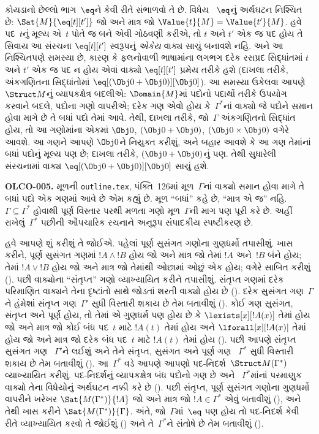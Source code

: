 કોયડાનો છેલ્લો ભાગ~$\eq$ને કેવી રીતે સંભાળવો તે છે. વિધેય
~$\eq$નું અર્થઘટન નિશ્ચિત છે: $\Sat{M}{\eq[t][t']}$ જો અને માત્ર જો
$\Value{t}{M}=\Value{t'}{M}$. હવે પદ~$t$નું મૂલ્ય એ~$t$ પોતે જ બને
એવી ગોઠવણી કરીએ, તો $t$ અને $t'$ એક જ પદ હોય તે સિવાય આ સંરચના
$\eq[t][t']$ સ્વરૂપનું \emph{એકેય} વાક્ય સાચું બનાવશે નહિ. અને આ
નિશ્ચિતપણે સમસ્યા છે, કારણ કે ફલનોવાળી ભાષામાંના લગભગ દરેક
રસપ્રદ સિદ્ધાંતમાં $t$ અને $t'$ એક જ પદ ન હોય એવાં વાક્યો
$\eq[t][t']$ પ્રમેય તરીકે હશે (દાખલા તરીકે, અંકગણિતના સિદ્ધાંતોમાં
$\eq[(\Obj 0+\Obj 0)][\Obj 0]$). આ સમસ્યા ઉકેલવા આપણે~$\Struct M$નું
વ્યાપકક્ષેત્ર બદલીએ: $\Domain{M}$માં પદોનો પદાર્થો તરીકે ઉપયોગ કરવાને
બદલે, પદોના ગણો વાપરીએ; દરેક ગણ એવો હોય કે~$\Gamma^*$નાં વાક્યો જે
પદોને સમાન હોવા માગે છે તે બધાં પદો તેમાં આવે. તેથી, દાખલા તરીકે,
જો~$\Gamma$ અંકગણિતનો સિદ્ધાંત હોય, તો આ ગણોમાંના એકમાં $\Obj 0$,
$(\Obj 0+\Obj 0)$, $(\Obj 0\times\Obj 0)$ વગેરે આવશે. આ ગણને આપણે
$\Obj 0$ને નિયુક્ત કરીશું, અને બહાર આવશે કે આ ગણ તેમાંનાં બધાં પદોનું
મૂલ્ય પણ છે; દાખલા તરીકે, $(\Obj 0+\Obj 0)$નું પણ. તેથી સુધારેલી
સંરચનામાં વાક્ય $\eq[(\Obj 0+\Obj 0)][\Obj 0]$ સાચું હશે.

\begin{editorial}
\textbf{OLCO-005.} મૂળની \texttt{outline.tex}, પંક્તિ~126માં મૂળ~$\Gamma$નાં વાક્યો સમાન હોવા માગે તે બધાં પદો એક ગણમાં આવે છે એમ કહ્યું છે. મૂળ ``બધાં'' કહે છે, ``માત્ર એ જ'' નહિ. $\Gamma\subseteq\Gamma^*$ હોવાથી પૂર્ણ વિસ્તાર પરથી મળતા ગણો મૂળ~$\Gamma$ની માગ પણ પૂરી કરે છે. અહીં રાખેલું~$\Gamma^*$ પછીની ઔપચારિક રચનાને અનુરૂપ સંપાદકીય સ્પષ્ટીકરણ છે.
\end{editorial}

હવે આપણે શું કરીશું તે જોઈએ. પહેલાં પૂર્ણ સુસંગત ગણોના ગુણધર્મો
તપાસીશું. ખાસ કરીને, પૂર્ણ સુસંગત ગણમાં $!A \land !B$ હોય જો
અને માત્ર જો તેમાં $!A$ અને~$!B$ બંને હોય; તેમાં $!A \lor !B$ હોય જો
અને માત્ર જો તેમાંથી ઓછામાં ઓછું એક હોય; વગેરે સાબિત કરીશું
(). પછી વાક્યોના ``સંતૃપ્ત'' ગણો
  વ્યાખ્યાયિત કરીને તપાસીશું. સંતૃપ્ત ગણમાં દરેક પરિમાણિત
  વાક્યને તેના દૃષ્ટાંતો સાથે જોડતાં શરતી વાક્યો હોય છે
  (). દરેક સુસંગત ગણ~$\Gamma$ને હંમેશાં
  સંતૃપ્ત ગણ~$\Gamma'$ સુધી વિસ્તારી શકાય છે તેમ બતાવીશું
  (). કોઈ ગણ સુસંગત, સંતૃપ્ત અને પૂર્ણ
  હોય, તો તેમાં એ ગુણધર્મ પણ હોય છે કે
  $\lexists[x][!A(x)]$ તેમાં હોય જો અને માત્ર જો કોઈ બંધ
    પદ~$t$ માટે $!A(t)$ તેમાં હોય અને
  $\lforall[x][!A(x)]$ તેમાં હોય જો અને માત્ર જો દરેક
    બંધ પદ~$t$ માટે $!A(t)$ તેમાં હોય
  ().
પછી આપણે સંતૃપ્ત સુસંગત ગણ
~$\Gamma'$ને લઈશું અને તેને
સંતૃપ્ત, સુસંગત અને પૂર્ણ ગણ
~$\Gamma^*$ સુધી વિસ્તારી શકાય છે તેમ બતાવીશું
(). આ~$\Gamma^*$ વડે આપણે આપણો
પદ-નિદર્શ~$\Struct M(\Gamma^*)$
વ્યાખ્યાયિત કરીશું.
પદ-નિદર્શનું વ્યાપકક્ષેત્ર બંધ પદોનો ગણ છે અને
  ~$\Gamma^*$માંનાં પરમાણુક વાક્યો તેના વિધેયોનું
  અર્થઘટન નક્કી કરે છે
(). પછી
સંતૃપ્ત, પૂર્ણ સુસંગત ગણોના ગુણધર્મો વાપરીને ખરેખર
$\Sat{M(\Gamma^*)}{!A}$ જો અને માત્ર જો
$!A\in\Gamma^*$ એવું બતાવીશું (), અને તેથી ખાસ
કરીને $\Sat{M(\Gamma^*)}{\Gamma}$.
અંતે, જો~$\Gamma$માં~$\eq$ પણ હોય તો પદ-નિદર્શ કેવી રીતે
  વ્યાખ્યાયિત કરવો તે જોઈશું () અને
  તે~$\Gamma^*$ને સંતોષે છે તેમ બતાવીશું ().
\endgroup


